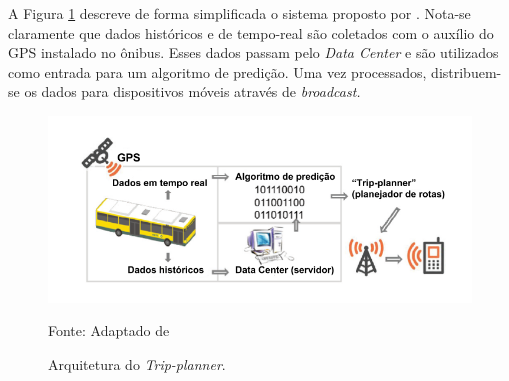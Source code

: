 A Figura \ref{fig:archLisbon} descreve de forma simplificada o sistema proposto por . Nota-se claramente que dados históricos e de tempo-real são coletados com o auxílio do GPS instalado no ônibus. Esses dados passam pelo \emph{Data Center} e são utilizados como entrada para um algoritmo de predição. Uma vez processados, distribuem-se os dados para dispositivos móveis através de \emph{broadcast.}

\begin{figure}[h]
\begin{center}
    \includegraphics[width=0.85\columnwidth]{../figs/arquitetura_tripplanner.png}
    \caption{Arquitetura do \emph{Trip-planner}.}Fonte: Adaptado de \cite{alves}
    \label{fig:archLisbon}
\end{center}
\end{figure}
